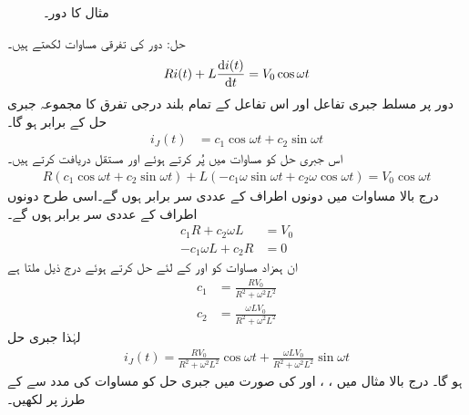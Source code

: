 \begin{figure}
\centering
{}
\caption{مثال  کا دور۔}
\label{شکل_بدلتا_مزاحمت_امالہ_جبری_حل_الف}
\end{figure}

حل: دور کی تفرقی مساوات لکھتے ہیں۔
\begin{align}\label{مساوات_بدلتا_مزاحمت_امالہ_جبری_حل_الف}
R i(t)+L \frac{\dif i(t)}{\dif t}=V_0 \cos \omega t
\end{align}
دور پر مسلط جبری تفاعل اور اس تفاعل کے تمام بلند درجی تفرق کا مجموعہ جبری حل کے برابر ہو گا۔
\begin{align*}
i_J(t)&=c_1 \cos \omega t+c_2\sin \omega t
\end{align*} 
اس جبری حل کو مساوات  میں پُر کرتے ہوئے  اور  مستقل دریافت کرتے ہیں۔ 
\begin{align*}
R(c_1 \cos \omega t+c_2\sin \omega t)+L (-c_1 \omega \sin\omega t+c_2 \omega \cos \omega t)=V_0 \cos \omega t
\end{align*}
درج بالا مساوات میں دونوں اطراف  کے  عددی سر برابر ہوں گے۔اسی طرح دونوں اطراف  کے عددی سر برابر ہوں گے۔
\begin{align*}
c_1 R+c_2 \omega L&=V_0\\
-c_1 \omega L+c_2 R&=0
\end{align*}
ان ہمزاد مساوات کو  اور  کے لئے حل کرتے ہوئے درج ذیل ملتا ہے
\begin{align*}
c_1&=\frac{R V_0}{R^2+\omega^2 L^2}\\
c_2&=\frac{\omega L V_0}{R^2+\omega^2 L^2}
\end{align*}
لہٰذا جبری حل
\begin{align}\label{مساوات_بدلتا_جبری_حل_الف}
i_J(t)=\frac{R V_0}{R^2+\omega^2 L^2} \cos \omega t+\frac{\omega L V_0}{R^2+\omega^2 L^2} \sin \omega t
\end{align}
ہو گا۔
درج بالا مثال میں ، ،  اور  کی صورت میں جبری حل کو مساوات  کی مدد سے  کے طرز پر لکھیں۔

